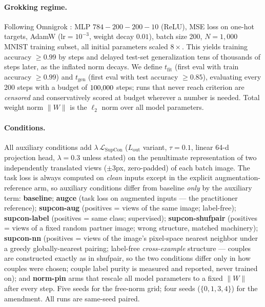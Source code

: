 \documentclass[11pt]{article}
\newcommand{\tgen}{t_{\mathrm{gen}}}
\newcommand{\tfit}{t_{\mathrm{fit}}}
\newcommand{\W}{\lVert W\rVert}
\begin{document}
\paragraph{Grokking regime.} Following Omnigrok \citep{liu2023omnigrok}: MLP
$784{-}200{-}200{-}10$ (ReLU), MSE loss on one-hot targets, AdamW ($\mathrm{lr}=10^{-3}$, weight
decay $0.01$), batch size 200, $N{=}1{,}000$ MNIST training subset, all initial parameters
scaled $8\times$. This yields training accuracy $\geq 0.99$ by \pfTfitFreeRange{} steps and
delayed test-set generalization tens of thousands of steps later, as the inflated norm decays.
We define $\tfit$ (first eval with train accuracy $\geq 0.99$) and $\tgen$ (first eval with test
accuracy $\geq 0.85$), evaluating every 200 steps with a budget of $100{,}000$ steps; runs that
never reach criterion are \emph{censored} and conservatively scored at budget wherever a number
is needed. Total weight norm $\W$ is the $\ell_2$ norm over all model parameters.

\paragraph{Conditions.} All auxiliary conditions add
$\lambda\,\mathcal{L}_{\mathrm{SupCon}}$ ($L_{\mathrm{out}}$ variant, $\tau=0.1$, linear
64-d projection head, $\lambda=0.3$ unless stated) on the penultimate representation of two
independently translated views ($\pm 3$px, zero-padded) of each batch image. The task loss is
always computed on \emph{clean} inputs except in the explicit augmentation-reference arm, so
auxiliary conditions differ from baseline \emph{only} by the auxiliary term:
\textbf{baseline}; \textbf{augce} (task loss on augmented inputs --- the practitioner
reference); \textbf{supcon-aug} (positives = views of the same image; label-free);
\textbf{supcon-label} (positives = same class; supervised); \textbf{supcon-shufpair}
(positives = views of a fixed random partner image; wrong structure, matched machinery);
\textbf{supcon-nn} (positives = views of the image's pixel-space nearest neighbor under a
greedy globally-nearest pairing; label-free \emph{cross-example} structure --- couples are
constructed exactly as in shufpair, so the two conditions differ only in how couples were
chosen; couple label purity is measured and reported, never trained on); and \textbf{norm-pin}
arms that rescale all model parameters to a fixed $\W$ after every step. Five seeds for the
free-norm grid; four seeds ($\{0,1,3,4\}$) for the amendment. All runs are same-seed paired.
\end{document}
